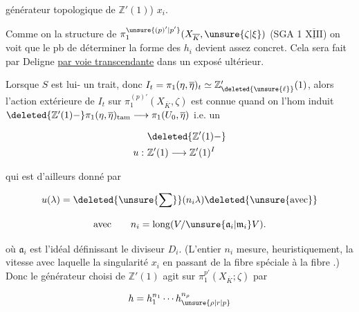générateur topologique de $\mathbb Z'(1)$)   $x_i$.

 Comme on  la structure de $\pi_1^{\unsure{(p)'|p'}}(X_{\overline K},\unsure{\zeta|\xi})$  (SGA 1 $\overline{\underline{\mathrm{XIII}}}$)  on voit que le pb de déterminer la forme des $h_i$ devient assez concret. Cela  sera fait par Deligne \uline{par voie transcendante} dans un exposé ultérieur.

Lorsque $S$ est lui-\unsure{$=$} un trait, donc  $I_t=\pi_1(\eta,\overline\eta)_t\simeq\mathbb Z'_{\deleted{\unsure{\ell}}}(1)$, alors l'action extérieure de $I_t$ sur $\pi_1^{(p)'}(X_{\overline K},\zeta)$ est connue quand on  l'hom induit $\deleted{\mathbb Z'(1)\mathbin{-}}\pi_1(\eta,\overline\eta)_{\mathrm{tam}}\longrightarrow\pi_1(U_0,\overline\eta)$ i.e. un 

\[
\begin{aligned}
&\deleted{\mathbb Z'(1)\mathbin{-}}\\
u:\ &\mathbb Z'(1)\longrightarrow\mathbb Z'(1)^I
\end{aligned}
\]

 qui est d'ailleurs donné par

\[
u(\lambda)=\deleted{\unsure{\sum}}(n_i\lambda)\deleted{\unsure{\text{avec}}}
\]

\[
\text{avec}\qquad n_i=\operatorname{long}(V/\unsure{\mathfrak a_i|\mathfrak m_i}V).
\]

où $\mathfrak a_i$ est l'idéal définissant le diviseur $D_i$. (L'entier $n_i$ mesure,  heuristiquement, la vitesse avec laquelle  la singularité $x_i$ en passant de la fibre spéciale à la fibre .) Donc le générateur choisi de $\mathbb Z'(1)$ agit  sur $\pi_1^{p'}(X_{\overline K};\zeta)$ par

\[
h=h_1^{n_1}\cdots h_{\unsure{\rho|r|p}}^{n_\rho}
\]
